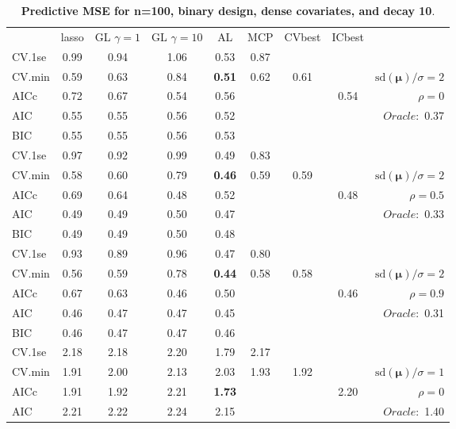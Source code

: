 \clearpage
\begin{table}\vspace{-.5cm}
\caption[l]{ { \bf Predictive MSE for n=100, binary design, 
dense covariates, and  decay  10}.}
\vspace{-.5cm}
\footnotesize{}
\begin{center}
\begin{tabular}{l*{7}{c}|r}
 & lasso & GL $\gamma=1$ & GL $\gamma=10$ & AL & MCP  & CVbest & ICbest  \\
\cline{1-9}
CV.1se & 0.99 & 0.94 & 1.06 & 0.53 & 0.87 & & & \\
CV.min & 0.59 & 0.63 & 0.84 & {\bf 0.51} & 0.62 & 0.61 & & $\mathrm{sd}(\mathbf{\mu})/\sigma=2$ \\
AICc & 0.72 & 0.67 & 0.54 & 0.56 & & & 0.54 &  $\rho=0$ \\
AIC & 0.55 & 0.55 & 0.56 & 0.52 & & & &  \multirow{2}{*}{$Oracle: $ 0.37} \\
BIC & 0.55 & 0.55 & 0.56 & 0.53 & & & &  \\
 \hline 
CV.1se & 0.97 & 0.92 & 0.99 & 0.49 & 0.83 & & & \\
CV.min & 0.58 & 0.60 & 0.79 & {\bf 0.46} & 0.59 & 0.59 & & $\mathrm{sd}(\mathbf{\mu})/\sigma=2$ \\
AICc & 0.69 & 0.64 & 0.48 & 0.52 & & & 0.48 &  $\rho=0.5$ \\
AIC & 0.49 & 0.49 & 0.50 & 0.47 & & & &  \multirow{2}{*}{$Oracle: $ 0.33} \\
BIC & 0.49 & 0.49 & 0.50 & 0.48 & & & &  \\
 \hline 
CV.1se & 0.93 & 0.89 & 0.96 & 0.47 & 0.80 & & & \\
CV.min & 0.56 & 0.59 & 0.78 & {\bf 0.44} & 0.58 & 0.58 & & $\mathrm{sd}(\mathbf{\mu})/\sigma=2$ \\
AICc & 0.67 & 0.63 & 0.46 & 0.50 & & & 0.46 &  $\rho=0.9$ \\
AIC & 0.46 & 0.47 & 0.47 & 0.45 & & & &  \multirow{2}{*}{$Oracle: $ 0.31} \\
BIC & 0.46 & 0.47 & 0.47 & 0.46 & & & &  \\
 \hline 
CV.1se & 2.18 & 2.18 & 2.20 & 1.79 & 2.17 & & & \\
CV.min & 1.91 & 2.00 & 2.13 & 2.03 & 1.93 & 1.92 & & $\mathrm{sd}(\mathbf{\mu})/\sigma=1$ \\
AICc & 1.91 & 1.92 & 2.21 & {\bf 1.73} & & & 2.20 &  $\rho=0$ \\
AIC & 2.21 & 2.22 & 2.24 & 2.15 & & & &  \multirow{2}{*}{$Oracle: $ 1.40} \\

\end{tabular}
\end{center}
\end{table}
